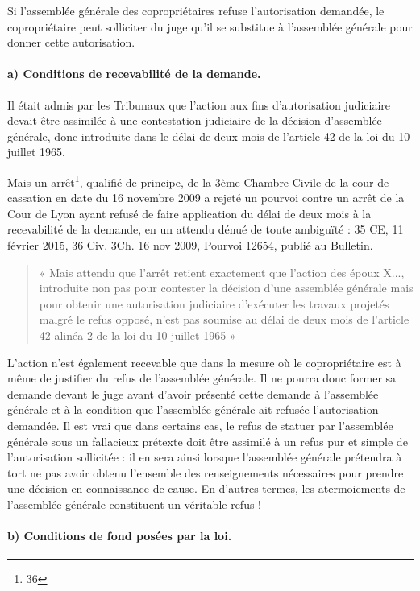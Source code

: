 			Si l'assemblée générale des copropriétaires refuse l'autorisation demandée, le copropriétaire peut solliciter du juge qu'il se substitue à l'assemblée générale pour donner cette autorisation.
			
			\paragraph{a) Conditions de recevabilité de la demande.}
			
				Il était admis par les Tribunaux que l’action aux fins d’autorisation judiciaire devait être assimilée à une contestation judiciaire de la décision d’assemblée générale, donc introduite dans le délai de deux mois de l’article 42 de la loi  du 10 juillet 1965.
				
				Mais un arrêt\footnote{36}, qualifié de principe, de la 3ème Chambre Civile de la cour de cassation en date du 16 novembre 2009 a rejeté un pourvoi contre un arrêt de la Cour de Lyon ayant refusé de faire application du délai de deux mois à la recevabilité de la demande, en un attendu dénué de toute ambiguïté :
				35 CE, 11 février 2015, 
				36 Civ. 3\degres Ch. 16 nov 2009, Pourvoi  12654, publié au Bulletin.
				\begin{quote}
					« Mais attendu que l'arrêt retient exactement que l'action des époux X..., introduite non pas pour contester la décision d'une assemblée générale mais pour obtenir une autorisation judiciaire d'exécuter les travaux projetés malgré le refus opposé, n'est pas soumise au délai de deux mois de l'article 42 alinéa 2 de la loi du 10 juillet 1965 »
				\end{quote}
			
				L'action n'est également recevable que dans la mesure où le copropriétaire est à même de justifier du refus de l'assemblée générale. Il ne pourra donc former sa demande devant le juge avant d'avoir présenté cette demande à l'assemblée générale et à la condition que l'assemblée générale ait refusée l'autorisation demandée. Il est vrai que dans certains cas, le refus de statuer par l'assemblée générale sous un fallacieux prétexte doit être assimilé à un refus pur et simple de l'autorisation sollicitée : il en sera ainsi lorsque l'assemblée générale prétendra à tort ne pas avoir obtenu l'ensemble des renseignements nécessaires pour prendre une décision en connaissance de cause. En d'autres termes, les atermoiements de l'assemblée générale constituent un véritable refus !
			
			\paragraph{b) Conditions de fond posées par la loi.}
			
